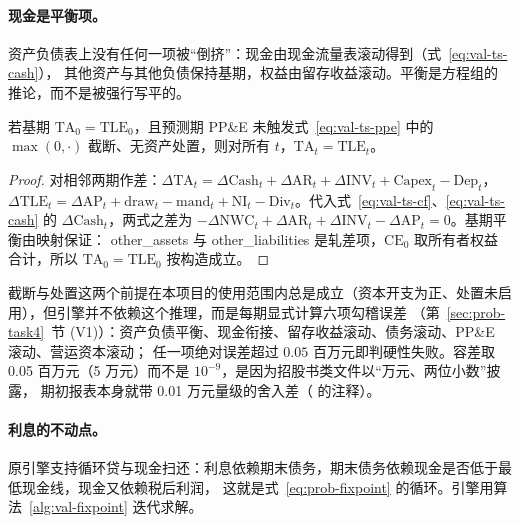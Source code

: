 \paragraph{现金是平衡项。} 资产负债表上没有任何一项被“倒挤”：现金由现金流量表滚动得到（式~\eqref{eq:val-ts-cash}），
其他资产与其他负债保持基期，权益由留存收益滚动。平衡是方程组的推论，而不是被强行写平的。

\begin{proposition}[预测期恒平衡]
\label{prop:val-balance}
若基期 $\text{TA}_0=\text{TLE}_0$，且预测期 PP\&E 未触发式~\eqref{eq:val-ts-ppe} 中的 $\max(0,\cdot)$ 截断、无资产处置，则对所有 $t$，$\text{TA}_t=\text{TLE}_t$。
\end{proposition}
\begin{proof}
对相邻两期作差：$\Delta\text{TA}_t=\Delta\text{Cash}_t+\Delta\text{AR}_t+\Delta\text{INV}_t+\text{Capex}_t-\text{Dep}_t$，
$\Delta\text{TLE}_t=\Delta\text{AP}_t+\text{draw}_t-\text{mand}_t+\text{NI}_t-\text{Div}_t$。代入式~\eqref{eq:val-ts-cf}、\eqref{eq:val-ts-cash}
的 $\Delta\text{Cash}_t$，两式之差为 $-\Delta\text{NWC}_t+\Delta\text{AR}_t+\Delta\text{INV}_t-\Delta\text{AP}_t=0$。基期平衡由映射保证：
other\_assets 与 other\_liabilities 是轧差项，$\text{CE}_0$ 取所有者权益合计，所以 $\text{TA}_0=\text{TLE}_0$ 按构造成立。
\end{proof}

截断与处置这两个前提在本项目的使用范围内总是成立（资本开支为正、处置未启用），但引擎并不依赖这个推理，而是每期显式计算六项勾稽误差
（第~\ref{sec:prob-task4}~节 (V1)）：资产负债平衡、现金衔接、留存收益滚动、债务滚动、PP\&E 滚动、营运资本滚动；
任一项绝对误差超过 $0.05$ 百万元即判硬性失败。容差取 0.05 百万元（5 万元）而不是 $10^{-9}$，是因为招股书类文件以“万元、两位小数”披露，
期初报表本身就带 0.01 万元量级的舍入差（ 的注释）。

\paragraph{利息的不动点。} 原引擎支持循环贷与现金扫还：利息依赖期末债务，期末债务依赖现金是否低于最低现金线，现金又依赖税后利润，
这就是式~\eqref{eq:prob-fixpoint} 的循环。引擎用算法~\ref{alg:val-fixpoint} 迭代求解。

